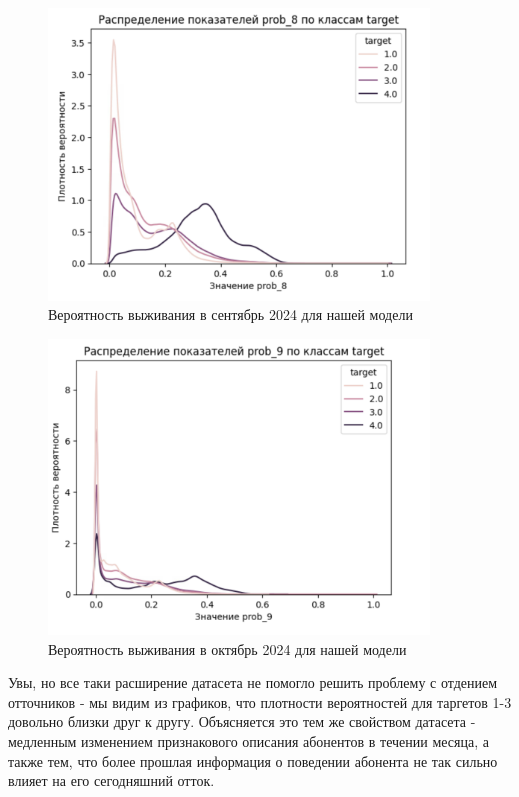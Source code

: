 \documentclass[a4paper,14pt,oneside,openany]{memoir}
\begin{document}
\begin{figure}[H]
	\includegraphics[width=0.9\textwidth]{../figures/prob_8_ours.png}
	\caption{Вероятность выживания в сентябрь 2024 для нашей модели}
\end{figure}

\begin{figure}[H]
	\includegraphics[width=0.9\textwidth]{../figures/prob_9_ours.png}
	\caption{Вероятность выживания в октябрь 2024 для нашей модели}
\end{figure}

Увы, но все таки расширение датасета не помогло решить проблему с отдением отточников - мы видим из графиков, что плотности вероятностей для таргетов 1-3 довольно близки друг к другу. Объясняется это тем же свойством датасета - медленным изменением признакового описания абонентов в течении месяца, а также тем, что более прошлая информация о поведении абонента не так сильно влияет на его сегодняшний отток. 
\end{document}
